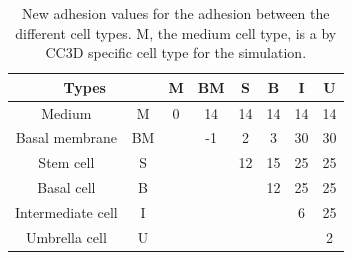 \begin{table}[ht]
\centering
\caption[New adhesion values for the different cell types]{New adhesion values for the adhesion between the different cell types. M, the medium cell type, is a by \ac{CC3D} specific cell type for the simulation.\newline}
\renewcommand{\arraystretch}{1.5}
	\begin{tabular}{|c|c||c|c|c|c|c|c|}
	\hline
		\multicolumn{2}{|c||}{Types} & M & BM & S & B & I & U \\
		\hline
		\hline
		
		Medium & M & 0 & 14 & 14 & 14 & 14 & 14 \\
		\hline
		Basal membrane & BM & & -1 & 2 & 3 & 30 & 30 \\
		\hline
		Stem cell & S & & & 12 & 15 & 25 & 25 \\
		\hline
		Basal cell & B & & & & 12 & 25 & 25 \\
		\hline
		Intermediate cell & I & & & & & 6 & 25 \\
		\hline
		Umbrella cell & U & & & & & & 2
\tabularnewline
\hline 
	\end{tabular}
	\label{tbl:NewAdhesion}
\end{table}

\newpage

